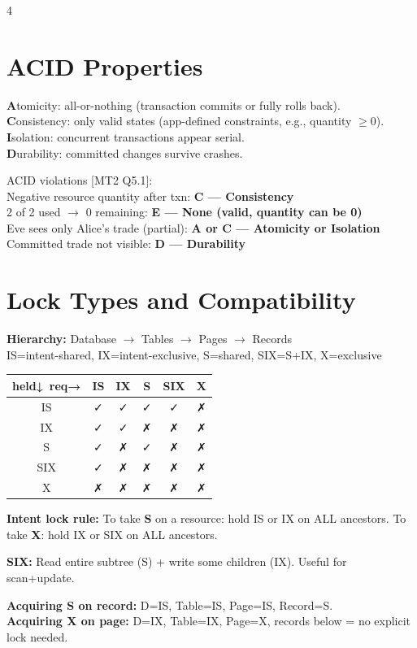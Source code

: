 \documentclass[8pt,letterpaper]{article}
\newcommand{\key}[1]{\textbf{\color{red!70!black}#1}}
\newcommand{\ans}[1]{\textbf{\color{blue!80!black}#1}}
\newcommand{\qref}[1]{{\fontsize{3.5}{4}\selectfont\color{purple!60!black}[#1]}}
\begin{document}
\begin{multicols*}{4}
\section{ACID Properties}
\key{A}tomicity: all-or-nothing (transaction commits or fully rolls back).\\
\key{C}onsistency: only valid states (app-defined constraints, e.g., quantity $\ge0$).\\
\key{I}solation: concurrent transactions appear serial.\\
\key{D}urability: committed changes survive crashes.

\begin{ansbox}
ACID violations \qref{MT2 Q5.1}:\\
Negative resource quantity after txn: \ans{C — Consistency}\\
2 of 2 used $\to$ 0 remaining: \ans{E — None (valid, quantity can be 0)}\\
Eve sees only Alice's trade (partial): \ans{A or C — Atomicity or Isolation}\\
Committed trade not visible: \ans{D — Durability}
\end{ansbox}

\section{Lock Types and Compatibility}
\key{Hierarchy:} Database $\to$ Tables $\to$ Pages $\to$ Records\\
IS=intent-shared, IX=intent-exclusive, S=shared, SIX=S+IX, X=exclusive

{\fontsize{4.2}{5}\selectfont\begin{tabular}{@{}c|ccccc@{}}
\textbf{held↓\ req→} & IS & IX & S & SIX & X \\
\hline
IS  & ✓ & ✓ & ✓ & ✓  & ✗ \\
IX  & ✓ & ✓ & ✗ & ✗  & ✗ \\
S   & ✓ & ✗ & ✓ & ✗  & ✗ \\
SIX & ✓ & ✗ & ✗ & ✗  & ✗ \\
X   & ✗ & ✗ & ✗ & ✗  & ✗ \\
\end{tabular}}

\key{Intent lock rule:} To take \textbf{S} on a resource: hold IS or IX on ALL ancestors. To take \textbf{X}: hold IX or SIX on ALL ancestors.

\key{SIX:} Read entire subtree (S) + write some children (IX). Useful for scan+update.

\key{Acquiring S on record:} D=IS, Table=IS, Page=IS, Record=S.\\
\key{Acquiring X on page:} D=IX, Table=IX, Page=X, records below = no explicit lock needed.


\end{multicols*}
\end{document}
